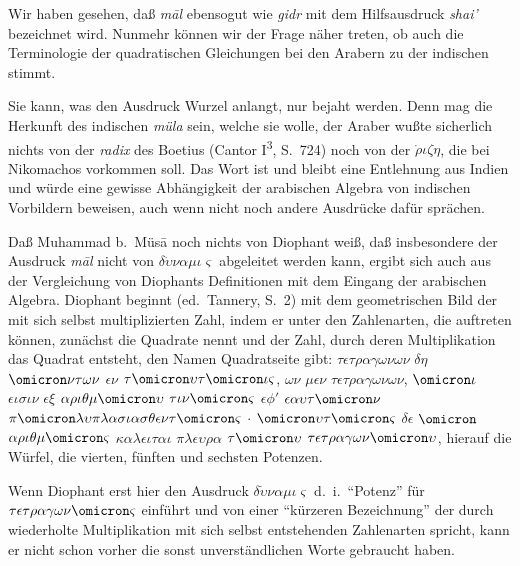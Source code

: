 \documentclass[11pt,a4paper]{article}
\newcommand{\enquote}[1]{``#1''}
\begin{document}
Wir haben gesehen, da\ss{} \textit{m\=al} ebensogut wie \textit{gidr} mit dem Hilfsausdruck \textit{shai'} bezeichnet wird. Nunmehr k\"onnen wir der Frage n\"aher treten, ob auch die Terminologie der quadratischen Gleichungen bei den Arabern zu der indischen stimmt.

Sie kann, was den Ausdruck Wurzel anlangt, nur bejaht werden. Denn mag die Herkunft des indischen \textit{m\"ula} sein, welche sie wolle, der Araber wu\ss{}te sicherlich nichts von der \textit{radix} des Boetius (Cantor I\textsuperscript{3}, S.\ 724) noch von der $\dot{\rho}\iota\zeta\eta$, die bei Nikomachos vorkommen soll. Das Wort ist und bleibt eine Entlehnung aus Indien und w\"urde eine gewisse Abh\"angigkeit der arabischen Algebra von indischen Vorbildern beweisen, auch wenn nicht noch andere Ausdr\"ucke daf\"ur spr\"achen.

Da\ss{} Muhammad b.\ M\"us\=a noch nichts von Diophant wei\ss{}, da\ss{} insbesondere der Ausdruck \textit{m\=al} nicht von $\delta\dot{\upsilon}\nu\alpha\mu\iota\varsigma$ abgeleitet werden kann, ergibt sich auch aus der Vergleichung von Diophants Definitionen mit dem Eingang der arabischen Algebra. Diophant beginnt (ed.\ Tannery, S.\ 2) mit dem geometrischen Bild der mit sich selbst multiplizierten Zahl, indem er unter den Zahlenarten, die auftreten k\"onnen, zun\"achst die Quadrate nennt und der Zahl, durch deren Multiplikation das Quadrat entsteht, den Namen Quadratseite gibt: $\tau\epsilon\tau\rho\alpha\gamma\omega\nu\omega\nu$ $\delta\eta$ $\omicron\nu\tau\omega\nu$ $\epsilon\nu$ $\tau\omicron\upsilon\tau\omicron\iota\varsigma$, $\omega\nu$ $\mu\epsilon\nu$ $\tau\epsilon\tau\rho\alpha\gamma\omega\nu\omega\nu$, $\omicron\iota$ $\epsilon\iota\sigma\iota\nu$ $\epsilon\xi$ $\alpha\rho\iota\theta\mu\omicron\upsilon$ $\tau\iota\nu\omicron\varsigma$ $\epsilon\phi'$ $\epsilon\alpha\upsilon\tau\omicron\nu$ $\pi\omicron\lambda\upsilon\pi\lambda\alpha\sigma\iota\alpha\sigma\theta\epsilon\nu\tau\omicron\varsigma$ $\cdot$ $\omicron\upsilon\tau\omicron\varsigma$ $\delta\epsilon$ $\omicron$ $\alpha\rho\iota\theta\mu\omicron\varsigma$ $\kappa\alpha\lambda\epsilon\iota\tau\alpha\iota$ $\pi\lambda\epsilon\upsilon\rho\alpha$ $\tau\omicron\upsilon$ $\tau\epsilon\tau\rho\alpha\gamma\omega\nu\omicron\upsilon$, hierauf die W\"urfel, die vierten, f\"unften und sechsten Potenzen.

Wenn Diophant erst hier den Ausdruck $\delta\dot{\upsilon}\nu\alpha\mu\iota\varsigma$ d.\ i.\ \enquote{Potenz} f\"ur $\tau\epsilon\tau\rho\alpha\gamma\omega\nu\omicron\varsigma$ einf\"uhrt und von einer \enquote{k\"urzeren Bezeichnung} der durch wiederholte Multiplikation mit sich selbst entstehenden Zahlenarten spricht, kann er nicht schon vorher die sonst unverst\"andlichen Worte gebraucht haben.
\end{document}

